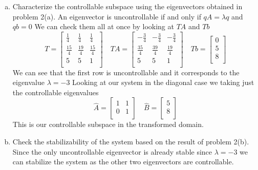 \documentclass{article}
\begin{document}
\begin{enumerate}[(a)]
\item Characterize the controllable subspace using the eigenvectors obtained in problem 2(a).
\newline
\newline
An eigenvector is uncontrollable if and only if $qA = \lambda q$ and $qb = 0$
We can check them all at once by looking at $TA$ and $Tb$
$$
T =
\begin{bmatrix}
\frac{1}{4} & \frac{1}{4} & \frac{1}{4} \\
\frac{15}{4} & \frac{19}{4} & \frac{15}{4} \\
 5 & 5 & 1 \\
\end{bmatrix}
\quad
TA =
\begin{bmatrix}
-\frac{3}{4} & -\frac{3}{4} & -\frac{3}{4} \\
\frac{35}{4} & \frac{39}{4} & \frac{19}{4} \\
 5 & 5 & 1 \\
\end{bmatrix}
\quad
Tb =
\begin{bmatrix}
0 \\
5 \\
8 \\
\end{bmatrix}
$$
We can see that the first row is uncontrollable and it corresponds to the eigenvalue $\lambda = -3$
Looking at our system in the diagonal case we taking just the controllable eigenvalues
$$
\hat{A} =
\begin{bmatrix}
1 & 1 \\
0 & 1 \\
\end{bmatrix}
\quad
\hat{B} =
\begin{bmatrix}
5 \\
8 \\
\end{bmatrix}
$$
This is our controllable subspace in the transformed domain.


\item Check the stabilizability of the system based on the result of problem 2(b).
\newline
\newline
Since the only uncontrollable eigenvector is already stable since $\lambda = -3$ we can stabilize the system as the other two eigenvectors are controllable.


\end{enumerate}
\end{document}
